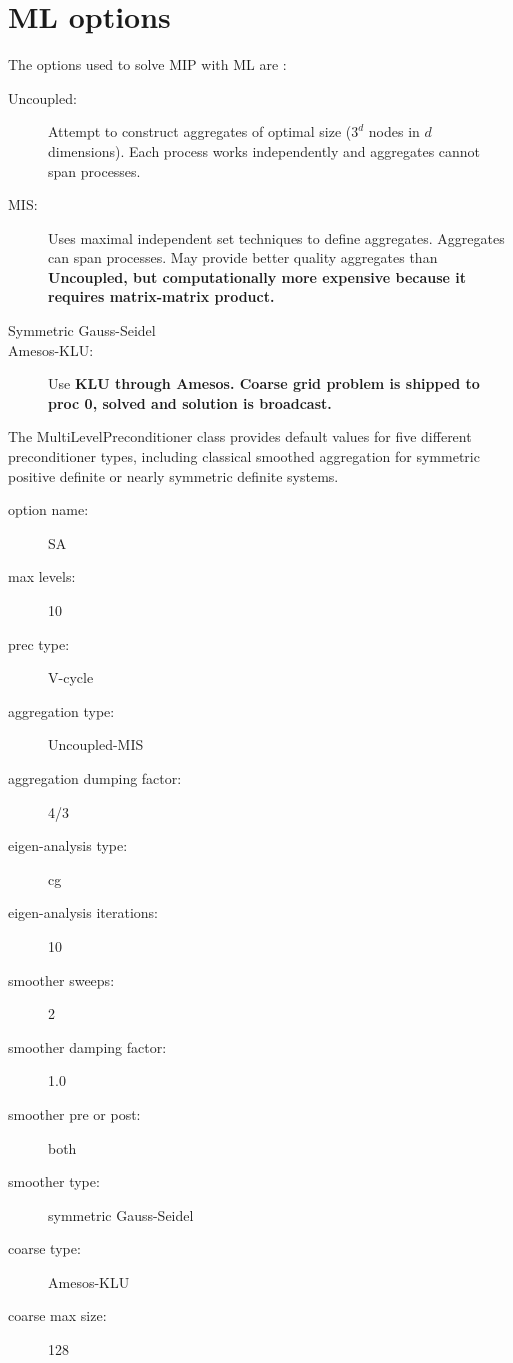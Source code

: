 \section{ML options}
The options used to solve MIP with ML are \cite{ml_guide}:
\begin{description}
\item [Uncoupled:] Attempt to construct aggregates of optimal size ($3^d$
nodes in $d$ dimensions). Each process works independently and aggregates
cannot span processes.
\item [MIS:] Uses maximal independent set techniques \cite{mis} to define
aggregates. Aggregates can span processes. May provide better quality
aggregates than \bf{Uncoupled}, but computationally more expensive because it
requires matrix-matrix product.
\item[Symmetric Gauss-Seidel]
\item[Amesos-KLU:] Use \bf{KLU} through \bf{Amesos}. Coarse grid problem is
shipped to proc 0, solved and solution is broadcast.
\end{description}
The MultiLevelPreconditioner class provides default values for five different
preconditioner types, including classical smoothed aggregation for symmetric
positive definite or nearly symmetric definite systems.
\begin{description}
\item [option name:] SA
\item [max levels:] 10
\item [prec type:] V-cycle
\item [aggregation type:] Uncoupled-MIS
\item [aggregation dumping factor:] 4/3
\item [eigen-analysis type:] cg
\item [eigen-analysis iterations:] 10
\item [smoother sweeps:] 2
\item [smoother damping factor:] 1.0
\item [smoother pre or post:] both
\item [smoother type:] symmetric Gauss-Seidel
\item [coarse type:] Amesos-KLU
\item [coarse max size:] 128
\end{description}
